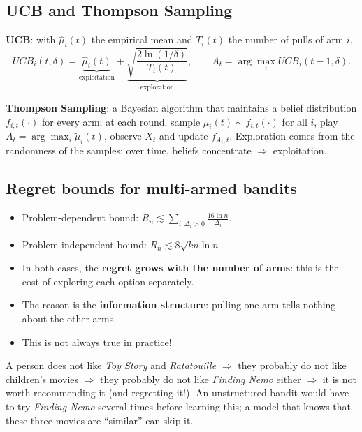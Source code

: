 \subsection{UCB and Thompson Sampling}

\textbf{UCB}: with $\hat{\mu}_i(t)$ the empirical mean and $T_i(t)$ the number of pulls of arm $i$,
\[
UCB_i(t,\delta) = \underbrace{\hat{\mu}_i(t)}_{\text{exploitation}} + \underbrace{\sqrt{\frac{2\ln(1/\delta)}{T_i(t)}}}_{\text{exploration}},
\qquad A_t = \arg\max_i UCB_i(t-1,\delta).
\]

\textbf{Thompson Sampling}: a Bayesian algorithm that maintains a belief distribution $f_{i,t}(\cdot)$ for every arm; at each round, sample $\tilde{\mu}_i(t) \sim f_{i,t}(\cdot)$ for all $i$, play $A_t = \arg\max_i \tilde{\mu}_i(t)$, observe $X_t$ and update $f_{A_t,t}$. Exploration comes from the randomness of the samples; over time, beliefs concentrate $\Rightarrow$ exploitation.

\subsection{Regret bounds for multi-armed bandits}

\begin{itemize}
    \item Problem-dependent bound: $R_n \lesssim \sum_{i:\Delta_i > 0} \frac{16\ln n}{\Delta_i}$.
    \item Problem-independent bound: $R_n \lesssim 8\sqrt{kn\ln n}$.
    \item In both cases, the \textbf{regret grows with the number of arms}: this is the cost of exploring each option separately.
    \item The reason is the \textbf{information structure}: pulling one arm tells nothing about the other arms.
    \item This is not always true in practice!
\end{itemize}

\begin{remark}
A person does not like \emph{Toy Story} and \emph{Ratatouille} $\Rightarrow$ they probably do not like children's movies $\Rightarrow$ they probably do not like \emph{Finding Nemo} either $\Rightarrow$ it is not worth recommending it (and regretting it!). An unstructured bandit would have to try \emph{Finding Nemo} several times before learning this; a model that knows that these three movies are ``similar'' can skip it.
\end{remark}


